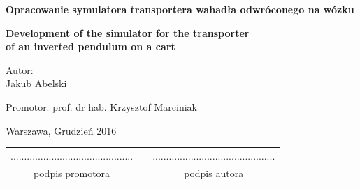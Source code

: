 \documentclass[12pt, oneside]{report}
\theoremstyle{definition}
\begin{document}
\begin{titlepage}
\linespread{1.5}
\begin{center}
\Huge
\textbf{Opracowanie symulatora transportera wahadła odwróconego na wózku}
\end{center}

\begin{center}
\Large
\textbf{Development of the simulator for the transporter \\of an inverted pendulum on a cart}
\end{center}


\vfill
\begin{center}
\Large
Autor:\\
\LARGE Jakub Abelski
\end{center}
\vfill
\begin{center}
\Large
Promotor: prof. dr hab. Krzysztof Marciniak
\end{center}
\vfill
\begin{center}
\large
Warszawa, Grudzień 2016
\end{center}

\newpage
\hfill
\begin{table}[b]
\centering
\begin{tabular}[t]{ccc}
............................................. & \hspace*{100pt} & .............................................\\
podpis promotora & \hspace*{100pt} & podpis autora
\end{tabular}
\end{table}
\end{titlepage}

\setlength{\parindent}{5ex}
\end{document}
